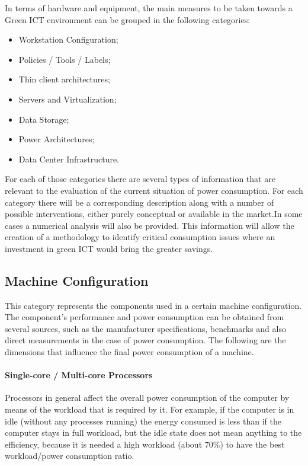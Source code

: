 {    In terms of hardware and equipment, the main measures to be taken towards a Green ICT environment can be grouped in the following categories:
    \begin{itemize}
        \item Workstation Configuration;
        \item Policies / Tools / Labels;
        \item Thin client architectures;
        \item Servers and Virtualization;
        \item Data Storage;
        \item Power Architectures;
        \item Data Center Infrastructure.
    \end{itemize}
    For each of those categories there are several types of information that are relevant to the evaluation of the current situation of power consumption. For each category there will be a corresponding description along with a number of possible interventions, either purely conceptual or available in the market.In some cases a numerical analysis will also be provided. This information will allow the creation of a methodology to identify critical consumption issues where an investment in green ICT would bring the greater savings.
    
    \subsection{Machine Configuration}\label{sec2:machine_configuration}
        This category represents the components used in a certain machine configuration. The component's performance and power consumption can be obtained from several sources, such as the manufacturer specifications, benchmarks and also direct measurements in the case of power consumption.
        The following are the dimensions that influence the final power consumption of a machine.
            \paragraph*{Single-core / Multi-core Processors} Processors in general affect the overall power consumption of the computer by means of the workload that is required by it. For example, if the computer is in idle (without any processes running) the energy consumed is less than if the computer stays in full workload, but the idle state does not mean anything to the efficiency, because it is needed a high workload (about 70\%) to have the best workload/power consumption ratio.
}
